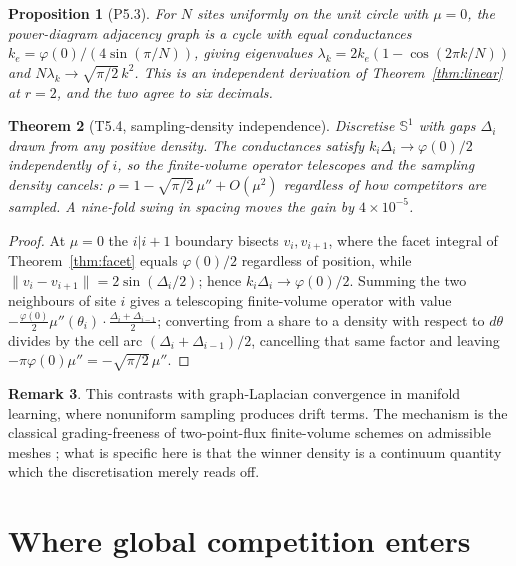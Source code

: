 \documentclass[11pt]{article}
\newtheorem{theorem}{Theorem}[section]
\newtheorem{proposition}[theorem]{Proposition}
\theoremstyle{definition}
\newtheorem{remark}[theorem]{Remark}
\newcommand{\Sph}{\mathbb{S}}
\begin{document}
\begin{proposition}[\textsf{P5.3}]\label{prop:cycle}
For $N$ sites uniformly on the unit circle with $\mu=0$, the power-diagram
adjacency graph is a cycle with equal conductances
$k_{e}=\varphi(0)/(4\sin(\pi/N))$, giving eigenvalues
$\lambda_{k}=2k_{e}(1-\cos(2\pi k/N))$ and $N\lambda_{k}\to\sqrt{\pi/2}\,k^{2}$.
This is an independent derivation of Theorem~\ref{thm:linear} at $r=2$, and the
two agree to six decimals.
\end{proposition}

\begin{theorem}[\textsf{T5.4}, sampling-density independence]\label{thm:density}
Discretise $\Sph^{1}$ with gaps $\Delta_{i}$ drawn from any positive density.
The conductances satisfy $k_{i}\Delta_{i}\to\varphi(0)/2$ independently of $i$,
so the finite-volume operator telescopes and the sampling density cancels:
$\rho=1-\sqrt{\pi/2}\,\mu''+O(\mu^{2})$ regardless of how competitors are
sampled. A nine-fold swing in spacing moves the gain by $4\times10^{-5}$.
\end{theorem}
\begin{proof}
At $\mu=0$ the $i|i{+}1$ boundary bisects $v_{i},v_{i+1}$, where the facet
integral of Theorem~\ref{thm:facet} equals $\varphi(0)/2$ regardless of
position, while $\lVert v_{i}-v_{i+1}\rVert=2\sin(\Delta_{i}/2)$; hence
$k_{i}\Delta_{i}\to\varphi(0)/2$. Summing the two neighbours of site $i$ gives
a telescoping finite-volume operator with value
$-\tfrac{\varphi(0)}2\mu''(\theta_{i})\cdot\tfrac{\Delta_{i}+\Delta_{i-1}}2$;
converting from a share to a density with respect to $d\theta$ divides by the
cell arc $(\Delta_{i}+\Delta_{i-1})/2$, cancelling that same factor and
leaving $-\pi\varphi(0)\mu''=-\sqrt{\pi/2}\,\mu''$.
\end{proof}

\begin{remark}
This contrasts with graph-Laplacian convergence in manifold learning, where
nonuniform sampling produces drift terms. The mechanism is the classical
grading-freeness of two-point-flux finite-volume schemes on admissible meshes
\cite{EGH}; what is specific here is that the winner density is a continuum
quantity which the discretisation merely reads off.
\end{remark}

\section{Where global competition enters}\label{sec:epsr}
\end{document}
